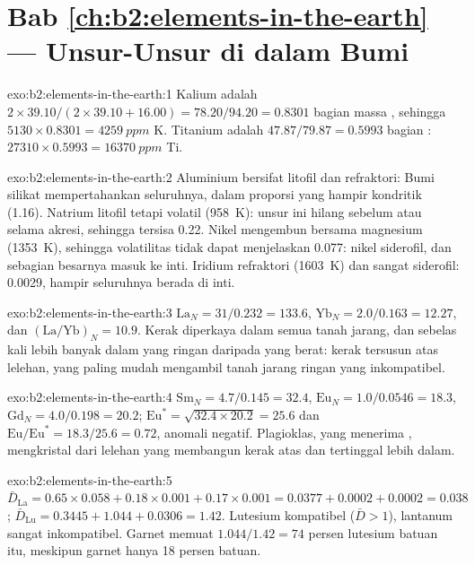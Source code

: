 \section*{Bab \ref{ch:b2:elements-in-the-earth} --- Unsur-Unsur di dalam Bumi}

\begin{solution}{exo:b2:elements-in-the-earth:1}
Kalium adalah $2\times39.10/(2\times39.10+16.00) = 78.20/94.20 = 0.8301$ bagian massa
, sehingga $\num{5130}\times0.8301 = \qty{4259}{ppm}$ K. Titanium adalah
$47.87/79.87 = 0.5993$ bagian : $\num{27310}\times0.5993 = \qty{16370}{ppm}$ Ti.
\end{solution}

\begin{solution}{exo:b2:elements-in-the-earth:2}
Aluminium bersifat litofil dan refraktori: Bumi silikat mempertahankan seluruhnya, dalam proporsi yang hampir
kondritik (1.16). Natrium litofil tetapi volatil (\qty{958}{K}): unsur ini
hilang sebelum atau selama akresi, sehingga tersisa 0.22. Nikel mengembun bersama magnesium
(\qty{1353}{K}), sehingga volatilitas tidak dapat menjelaskan 0.077: nikel siderofil, dan sebagian besarnya
masuk ke inti. Iridium refraktori (\qty{1603}{K}) dan sangat siderofil:
0.0029, hampir seluruhnya berada di inti.
\end{solution}

\begin{solution}{exo:b2:elements-in-the-earth:3}
$\mathrm{La}_N = 31/0.232 = 133.6$, $\mathrm{Yb}_N = 2.0/0.163 = 12.27$, dan
$(\mathrm{La}/\mathrm{Yb})_N = 10.9$. Kerak diperkaya dalam semua tanah jarang, dan
sebelas kali lebih banyak dalam yang ringan daripada yang berat: kerak tersusun atas lelehan, yang
paling mudah mengambil tanah jarang ringan yang inkompatibel.
\end{solution}

\begin{solution}{exo:b2:elements-in-the-earth:4}
$\mathrm{Sm}_N = 4.7/0.145 = 32.4$, $\mathrm{Eu}_N = 1.0/0.0546 = 18.3$,
$\mathrm{Gd}_N = 4.0/0.198 = 20.2$; $\mathrm{Eu}^* = \sqrt{32.4\times20.2} = 25.6$ dan
$\mathrm{Eu}/\mathrm{Eu}^* = 18.3/25.6 = 0.72$, anomali negatif. Plagioklas, yang
menerima , mengkristal dari lelehan yang membangun kerak atas dan tertinggal
lebih dalam.
\end{solution}

\begin{solution}{exo:b2:elements-in-the-earth:5}
$\bar D_{\mathrm{La}} = 0.65\times0.058+0.18\times0.001+0.17\times0.001 = 0.0377 +
0.0002 + 0.0002 = 0.038$; $\bar D_{\mathrm{Lu}} = 0.3445+1.044+0.0306 = 1.42$. Lutesium
kompatibel ($\bar D > 1$), lantanum sangat inkompatibel. Garnet memuat
$1.044/1.42 = 74$ persen lutesium batuan itu, meskipun garnet hanya 18 persen
batuan.
\end{solution}

